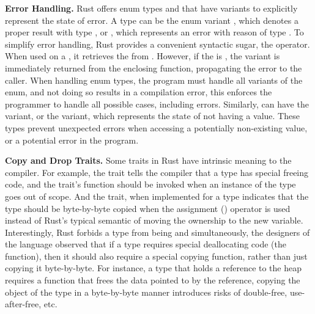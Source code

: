 \textbf{Error Handling.}
Rust offers enum types  and  that have
variants to explicitly represent the state of error.
A  type can be the enum variant , which denotes a
proper result with type , or , which represents an error
with reason of type .
To simplify error handling,
Rust provides a convenient syntactic sugar,
the  operator.
When used on a , it retrieves the  from .
However, if the  is , the  variant is
immediately returned from the enclosing function, propagating the error to the
caller.
When handling enum types, the program must handle all variants of the enum,
and not doing so results in a compilation error, this enforces the programmer
to handle all possible cases, including errors.
Similarly,  can have the  variant, or the
 variant, which represents the state of not having a value.
These types prevent unexpected errors when accessing a potentially non-existing
value, or a potential error in the program.

\textbf{Copy and Drop Traits.}
Some traits in Rust have intrinsic meaning to the compiler. For example, the
 trait tells the compiler that a type has special freeing code, and
the  trait's  function should be invoked when an instance
of the type goes out of scope. And the  trait, when implemented for
a type indicates that the type should be byte-by-byte copied when the
assignment (\code{=}) operator is used instead of Rust's typical semantic
of moving the ownership to the new variable. Interestingly, Rust forbids a type
from being  and  simultaneously, the designers of the
language observed that if a type requires special deallocating code (the
 function), then it should also require a special copying function,
rather than just copying it byte-by-byte. For instance, a type that holds a
reference to the heap requires a  function that frees the data
pointed to by the reference, copying the object of the type in a byte-by-byte
manner introduces risks of double-free, use-after-free, etc.

